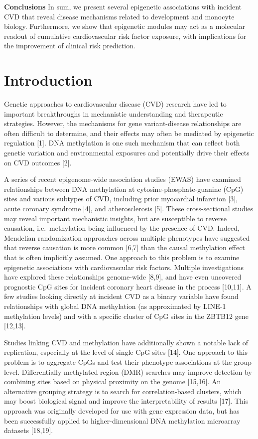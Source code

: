 \documentclass[]{bmcart}
\theoremstyle{definition}
\theoremstyle{definition}
\theoremstyle{definition}
\theoremstyle{remark}
\begin{document}
\textbf{Conclusions} In sum, we present several epigenetic associations
with incident CVD that reveal disease mechanisms related to development
and monocyte biology. Furthermore, we show that epigenetic modules may
act as a molecular readout of cumulative cardiovascular risk factor
exposure, with implications for the improvement of clinical risk
prediction.

\section{Introduction}\label{introduction}

Genetic approaches to cardiovascular disease (CVD) research have led to
important breakthroughs in mechanistic understanding and therapeutic
strategies. However, the mechanisms for gene variant-disease
relationships are often difficult to determine, and their effects may
often be mediated by epigenetic regulation {[}1{]}. DNA methylation is
one such mechanism that can reflect both genetic variation and
environmental exposures and potentially drive their effects on CVD
outcomes {[}2{]}.

A series of recent epigenome-wide association studies (EWAS) have
examined relationships between DNA methylation at
cytosine-phosphate-guanine (CpG) sites and various subtypes of CVD,
including prior myocardial infarction {[}3{]}, acute coronary syndrome
{[}4{]}, and atherosclerosis {[}5{]}. These cross-sectional studies may
reveal important mechanistic insights, but are susceptible to reverse
causation, i.e.~methylation being influenced by the presence of CVD.
Indeed, Mendelian randomization approaches across multiple phenotypes
have suggested that reverse causation is more common {[}6,7{]} than the
causal methylation effect that is often implicitly assumed. One approach
to this problem is to examine epigenetic associations with
cardiovascular risk factors. Multiple investigations have explored these
relationships genome-wide {[}8,9{]}, and have even uncovered prognostic
CpG sites for incident coronary heart disease in the process
{[}10,11{]}. A few studies looking directly at incident CVD as a binary
variable have found relationships with global DNA methylation (as
approximated by LINE-1 methylation levels) and with a specific cluster
of CpG sites in the ZBTB12 gene {[}12,13{]}.

Studies linking CVD and methylation have additionally shown a notable
lack of replication, especially at the level of single CpG sites
{[}14{]}. One approach to this problem is to aggregate CpGs and test
their phenotype associations at the group level. Differentially
methylated region (DMR) searches may improve detection by combining
sites based on physical proximity on the genome {[}15,16{]}. An
alternative grouping strategy is to search for correlation-based
clusters, which may boost biological signal and improve the
interpretability of results {[}17{]}. This approach was originally
developed for use with gene expression data, but has been successfully
applied to higher-dimensional DNA methylation microarray datasets
{[}18,19{]}.
\end{document}
